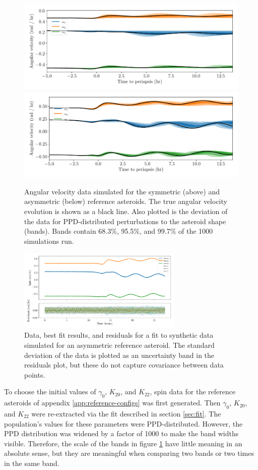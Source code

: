 \documentclass[fleqn,usenatbib]{mnras}
\begin{document}
\begin{figure}
  \centering
  \includegraphics[width=0.7\linewidth]{figs/nominal-data-sym.pdf}
  \includegraphics[width=0.7\linewidth]{figs/nominal-data-asym.pdf}
  \caption{Angular velocity data simulated for the symmetric (above) and asymmetric (below) reference asteroids. The true angular velocity evolution is shown as a black line. Also plotted is the deviation of the data for PPD-distributed perturbations to the asteroid shape (bands). Bands contain 68.3\%, 95.5\%, and 99.7\% of the 1000 simulations run.}
  \label{fig:example-data}
\end{figure}

\begin{figure}
  \centering
  \includegraphics[width=0.7\textwidth]{figs/example-residuals.pdf}
  \caption{Data, best fit results, and residuals for a fit to synthetic data simulated for an asymmetric reference asteroid. The standard deviation of the data is plotted as an uncertainty band in the residuals plot, but these do not capture covariance between data points.}
  \label{fig:example-residuals}
\end{figure}

To choose the initial values of $\gamma_0$, $K_{20}$, and $K_{22}$, spin data for the reference asteroids of appendix \ref{app:reference-configs} was first generated. Then $\gamma_0$, $K_{20}$, and $K_{22}$ were re-extracted via the fit described in section \ref{sec:fit}. The population's values for these parameters were PPD-distributed. However, the PPD distribution was widened by a factor of 1000 to make the band widths visible. Therefore, the scale of the bands in figure \ref{fig:example-data} have little meaning in an absolute sense, but they are meaningful when comparing two bands or two times in the same band.
\end{document}
